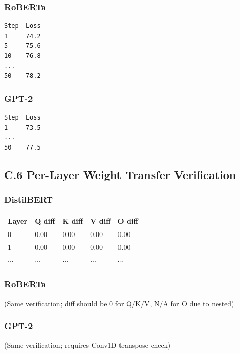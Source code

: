 \subsubsection{RoBERTa}

\begin{lstlisting}
Step  Loss
1     74.2
5     75.6
10    76.8
...
50    78.2
\end{lstlisting}

\subsubsection{GPT-2}

\begin{lstlisting}
Step  Loss
1     73.5
...
50    77.5
\end{lstlisting}

\subsection{C.6 Per-Layer Weight Transfer Verification}

\subsubsection{DistilBERT}

\begin{table}[H]
\centering
\small
\begin{tabular}{lllll}
\toprule
\textbf{Layer} & \textbf{Q diff} & \textbf{K diff} & \textbf{V diff} & \textbf{O diff} \\
\midrule
0 & 0.00 & 0.00 & 0.00 & 0.00 \\
1 & 0.00 & 0.00 & 0.00 & 0.00 \\
... & ... & ... & ... & ... \\
\bottomrule
\end{tabular}
\end{table}

\subsubsection{RoBERTa}

(Same verification; diff should be 0 for Q/K/V, N/A for O due to nested)

\subsubsection{GPT-2}

(Same verification; requires Conv1D transpose check)

